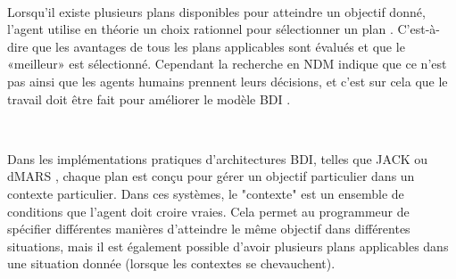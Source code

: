 ~\par
Lorsqu'il existe plusieurs plans disponibles pour atteindre un objectif donné, l'agent utilise en théorie un choix rationnel pour sélectionner un plan \parencite{bratman1988plans}. C'est-à-dire que les avantages de tous les plans applicables sont évalués et que le «meilleur» est sélectionné. Cependant la recherche en NDM indique que ce n'est pas ainsi que les agents humains prennent leurs décisions, et c'est sur cela que le travail doit être fait pour  améliorer le modèle BDI .

~\par
Dans les implémentations pratiques d'architectures BDI, telles que JACK \parencite{jack} ou dMARS \parencite{dmars1997formal}, chaque plan est conçu pour gérer un objectif particulier dans un contexte particulier. Dans ces systèmes, le "contexte" est un ensemble de conditions que l'agent doit croire vraies. Cela permet au programmeur de spécifier différentes manières d'atteindre le même objectif dans différentes situations, mais il est également possible d'avoir plusieurs plans applicables dans une situation donnée (lorsque les contextes se chevauchent).
